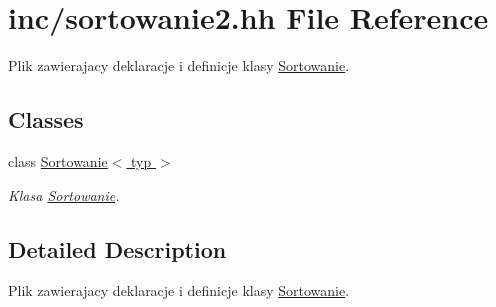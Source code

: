 \hypertarget{sortowanie2_8hh}{\section{inc/sortowanie2.hh File Reference}
\label{sortowanie2_8hh}
}


Plik zawierajacy deklaracje i definicje klasy \hyperlink{class_sortowanie}{Sortowanie}.  


\subsection*{Classes}
\begin{DoxyCompactItemize}
\item 
class \hyperlink{class_sortowanie}{Sortowanie$<$ typ $>$}
\begin{DoxyCompactList}\small\item\em Klasa \hyperlink{class_sortowanie}{Sortowanie}. \end{DoxyCompactList}\end{DoxyCompactItemize}


\subsection{Detailed Description}
Plik zawierajacy deklaracje i definicje klasy \hyperlink{class_sortowanie}{Sortowanie}. 